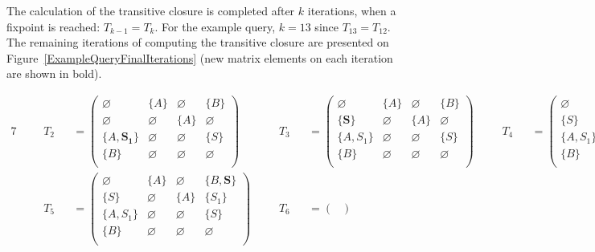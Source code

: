\begin{example}
The calculation of the transitive closure is completed after $k$ iterations, when a fixpoint is reached: $T_{k-1} = T_k$. For the example query, $k = 13$ since $T_{13} = T_{12}$. The remaining iterations of computing the transitive closure are presented on Figure~\ref{ExampleQueryFinalIterations} (new matrix elements on each iteration are shown in bold).


\begin{alignat*}{7}
& &&T_2 &&= \begin{pmatrix}
\varnothing & \{A\}       & \varnothing & \{B\}       \\
\varnothing & \varnothing & \{A\}       & \varnothing \\
\{A, \pmb{S_1}\}  & \varnothing & \varnothing & \{S\}       \\
\{B\}       & \varnothing & \varnothing & \varnothing \\
\end{pmatrix} \ \ \ \ &&T_3 &&= \begin{pmatrix}
\varnothing & \{A\}       & \varnothing & \{B\}       \\
\{\pmb{S}\}       & \varnothing & \{A\}       & \varnothing \\
\{A, S_1\}  & \varnothing & \varnothing & \{S\}       \\
\{B\}       & \varnothing & \varnothing & \varnothing \\
\end{pmatrix} \ \ \ \ &&T_4 &&= \begin{pmatrix}
\varnothing & \{A\}       & \varnothing & \{B\}       \\
\{S\}       & \varnothing & \{A\}       & \{\pmb{S_1}\}     \\
\{A, S_1\}  & \varnothing & \varnothing & \{S\}       \\
\{B\}       & \varnothing & \varnothing & \varnothing \\
\end{pmatrix}  \\
& &&T_5 &&= \begin{pmatrix}
\varnothing & \{A\}       & \varnothing & \{B, \pmb{S}\}    \\
\{S\}       & \varnothing & \{A\}       & \{S_1\}     \\
\{A, S_1\}  & \varnothing & \varnothing & \{S\}       \\
\{B\}       & \varnothing & \varnothing & \varnothing \\
\end{pmatrix} \ \ \ \ &&T_6 &&= \begin{pmatrix}

\end{pmatrix}
\end{alignat*}
\end{example}
